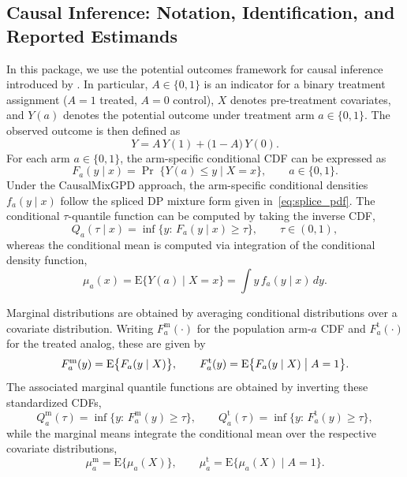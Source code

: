 \documentclass[article]{jss}\usepackage[]{graphicx}\usepackage[]{xcolor}
\DeclareRobustCommand{\pkg}[1]{\textsf{#1}}
\begin{document}
\subsection{Causal Inference: Notation, Identification, and Reported Estimands}
\label{subsec:causal}

In this package, we use the potential outcomes framework for causal inference introduced by
\citet{Rubin1974}. In particular, $A\in\{0,1\}$
is an indicator for a binary treatment assignment ($A=1$ treated, $A=0$
control), $X$ denotes pre-treatment covariates, and $Y(a)$ denotes the
potential outcome under treatment arm $a\in\{0,1\}$.  The observed outcome is then defined as
\begin{equation}
Y = A\,Y(1) + \bigl(1-A\bigr)\,Y(0).
\label{eq:po_observed}
\end{equation}
For each arm $a\in\{0,1\}$, the arm-specific conditional CDF
can be expressed as
\begin{equation}
F_a(y\mid x)=\Pr\;\{Y(a)\le y \mid X=x\},\qquad a\in\{0,1\}.
\label{eq:po_cond_cdf}
\end{equation}
Under the \pkg{CausalMixGPD} approach, the arm-specific conditional
densities $f_a(y\mid x)$ follow the spliced DP mixture form
given in~\eqref{eq:splice_pdf}.  The conditional $\tau$-quantile function can be computed by taking the inverse CDF,
\begin{equation}
Q_a(\tau\mid x)=\inf\{y:\,F_a(y\mid x)\ge \tau\},\qquad \tau\in(0,1),
\label{eq:po_cond_quantile}
\end{equation}
whereas the conditional mean is computed via integration of the conditional
density function,
\begin{equation}
\mu_a(x)=\mathrm{E}\{Y(a)\mid X=x\}=\int y\, f_a(y\mid x)\,dy.
\label{eq:po_cond_mean}
\end{equation}


Marginal distributions are obtained by averaging
conditional distributions over a covariate distribution.  Writing
$F_a^{\mathrm{m}}(\cdot)$ for the population arm-$a$ CDF and
$F_a^{\mathrm{t}}(\cdot)$ for the treated analog, these are given by
\begin{equation}
F_a^{\mathrm{m}}(y)=\mathrm{E}\bigl\{F_a(y\mid X)\bigr\},
\qquad
F_a^{\mathrm{t}}(y)=\mathrm{E}\bigl\{F_a(y\mid X)\bigm\vert A=1\bigr\}.
\label{eq:marginal_cdf_defs}
\end{equation}
The associated marginal quantile functions are obtained by inverting
these standardized CDFs,
\begin{equation}
Q_a^{\mathrm{m}}(\tau)=\inf\{y:\,F_a^{\mathrm{m}}(y)\ge \tau\},
\qquad
Q_a^{\mathrm{t}}(\tau)=\inf\{y:\,F_a^{\mathrm{t}}(y)\ge \tau\},
\label{eq:marginal_quantile_defs}
\end{equation}
while the marginal means integrate the conditional mean over the
respective covariate distributions,
\begin{equation}
\mu_a^{\mathrm{m}}=\mathrm{E}\bigl\{\mu_a(X)\bigr\},
\qquad
\mu_a^{\mathrm{t}}=\mathrm{E}\bigl\{\mu_a(X)\mid A=1\bigr\}.
\label{eq:marginal_mean_defs}
\end{equation}
\end{document}
